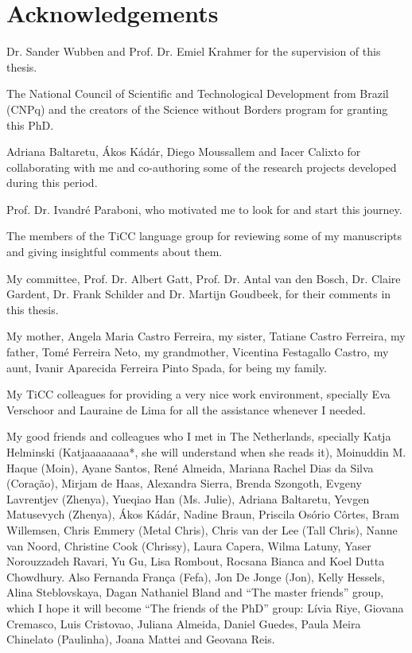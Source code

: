 {}

\chapter*{Acknowledgements}

\normalsize
Dr. Sander Wubben and Prof. Dr. Emiel Krahmer for the supervision of this thesis. 

The National Council of Scientific and Technological Development from Brazil (CNPq) and the creators of the Science without Borders program for granting this PhD.

Adriana Baltaretu, Ákos Kádár, Diego Moussallem and Iacer Calixto for collaborating with me and co-authoring some of the research projects developed during this period. 

Prof. Dr. Ivandré Paraboni, who motivated me to look for and start this journey. 

The members of the TiCC language group for reviewing some of my manuscripts and giving insightful comments about them. 

My committee, Prof. Dr. Albert Gatt, Prof. Dr. Antal van den Bosch, Dr. Claire Gardent, Dr. Frank Schilder and Dr. Martijn Goudbeek, for their comments in this thesis.

My mother, Angela Maria Castro Ferreira, my sister, Tatiane Castro Ferreira, my father, Tomé Ferreira Neto, my grandmother, Vicentina Festagallo Castro, my aunt, Ivanir Aparecida Ferreira Pinto Spada, for being my family.

My TiCC colleagues for providing a very nice work environment, specially Eva Verschoor and Lauraine de Lima for all the assistance whenever I needed.

My good friends and colleagues who I met in The Netherlands, specially Katja Helminski (Katjaaaaaaaa*, she will understand when she reads it), Moinuddin M. Haque (Moin), Ayane Santos, René Almeida, Mariana Rachel Dias da Silva (Coração), Mirjam de Haas, Alexandra Sierra, Brenda Szongoth, Evgeny Lavrentjev (Zhenya), Yueqiao Han (Ms. Julie), Adriana Baltaretu, Yevgen Matusevych (Zhenya), Ákos Kádár, Nadine Braun, Priscila Osório Côrtes, Bram Willemsen, Chris Emmery (Metal Chris), Chris van der Lee (Tall Chris), Nanne van Noord, Christine Cook (Chrissy), Laura Capera, Wilma Latuny, Yaser Norouzzadeh Ravari, Yu Gu, Lisa Rombout, Rocsana Bianca and Koel Dutta Chowdhury. Also Fernanda França (Fefa), Jon De Jonge (Jon), Kelly Hessels, Alina Steblovskaya, Dagan Nathaniel Bland and “The master friends” group, which I hope it will become “The friends of the PhD” group: Lívia Riye, Giovana Cremasco, Luis Cristovao, Juliana Almeida, Daniel Guedes, Paula Meira Chinelato (Paulinha), Joana Mattei and Geovana Reis.

